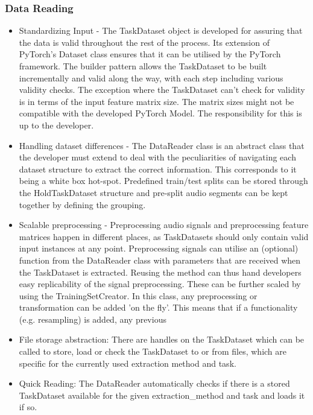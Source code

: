 \subsubsection{Data Reading}
\begin{itemize}
	\item Standardizing Input - The TaskDataset object is developed for assuring that the data is valid throughout the rest of the process. Its extension of PyTorch's Dataset class ensures that it can be utilised by the PyTorch framework. The builder pattern allows the TaskDataset to be built incrementally and valid along the way, with each step including various validity checks.
	The exception where the TaskDataset can't check for validity is in terms of the input feature matrix size. The matrix sizes might not be compatible with the developed PyTorch Model. The responsibility for this is up to the developer.
	\item Handling dataset differences - The DataReader class is an abstract class that the developer must extend to deal with the peculiarities of navigating each dataset structure to extract the correct information. This corresponds to it being a white box hot-spot. Predefined train/test splits can be stored through the HoldTaskDataset structure and pre-split audio segments can be kept together by defining the grouping. 
	\item Scalable preprocessing - Preprocessing audio signals and preprocessing feature matrices happen in different places, as TaskDatasets should only contain valid input instances at any point. Preprocessing signals can utilise an (optional) function from the DataReader class with parameters that are received when the TaskDataset is extracted. Reusing the method can thus hand developers easy replicability of the signal preprocessing. These can be further scaled by using the TrainingSetCreator. In this class, any preprocessing or transformation can be added 'on the fly'. This means that if a functionality (e.g. resampling) is added, any previous 
	\item File storage abstraction: There are handles on the TaskDataset which can be called to store, load or check the TaskDataset to or from files, which are specific for the currently used extraction method and task.
	\item Quick Reading: The DataReader automatically checks if there is a stored TaskDataset available for the given extraction\_method and task and loads it if so.
\end{itemize}
